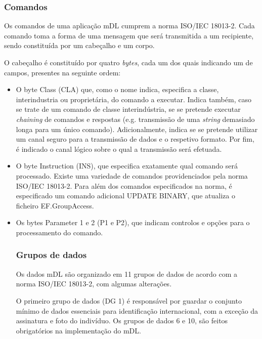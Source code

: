 \documentclass[11pt]{article}
\begin{document}
\subsubsection{Comandos}

Os comandos de uma aplicação mDL cumprem a norma ISO/IEC 18013-2. Cada comando toma a forma de uma mensagem que será transmitida a um recipiente, sendo constituída por um cabeçalho e um corpo.

O cabeçalho é constituído por quatro \textit{bytes}, cada um dos quais indicando um de campos, presentes na seguinte ordem:
\begin{itemize}
    \item O byte Class (CLA) que, como o nome indica, especifica a classe, interindustria ou proprietária, do comando a executar. Indica também, caso se trate de um comando de classe interindústria, se se pretende executar \textit{chaining} de comandos e respostas (e.g. transmissão de uma \textit{string} demasiado longa para um único comando). Adicionalmente, indica se se pretende utilizar um canal seguro para a transmissão de dados e o respetivo formato. Por fim, é indicado o canal lógico sobre o qual a transmissão será efetuada.

    \item O byte Instruction (INS), que especifica exatamente qual comando será processado. Existe uma variedade de comandos providenciados pela norma ISO/IEC 18013-2. Para além dos comandos especificados na norma, é especificado um comando adicional UPDATE BINARY, que atualiza o ficheiro EF.GroupAccess.%

    \item Os bytes Parameter 1 e 2 (P1 e P2), que indicam controlos e opções para o processamento do comando.
\begin{itemize}


\subsubsection{Grupos de dados}

Os dados mDL são organizado em 11 grupos de dados de acordo com a norma ISO/IEC 18013-2, com algumas alterações. 

O primeiro grupo de dados (DG 1) é responsável por guardar o conjunto mínimo de dados essenciais para identificação internacional, com a exceção da assinatura e foto do indivíduo. Os grupos de dados 6 e 10, são feitos obrigatórios na implementação do mDL. 


\end{itemize}
\end{itemize}
\end{document}
